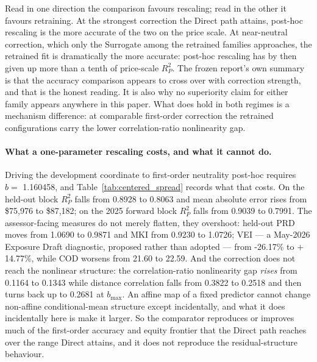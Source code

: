 \documentclass[10pt]{article}
\theoremstyle{definition}
\newcommand{\1}{\mathbf{1}}
\begin{document}
Read in one direction the comparison favours rescaling; read in the other it favours
retraining. At the strongest correction the Direct path attains, post-hoc rescaling is the more
accurate of the two on the price scale. At near-neutral correction, which only the Surrogate among
the retrained families approaches, the retrained fit is dramatically the more accurate: post-hoc
rescaling has by then given up more than a tenth of price-scale $R^2_P$. The frozen report's own
summary is that the accuracy comparison appears to cross over with correction strength, and that is
the honest reading. It is also why no superiority claim for either family appears anywhere in this
paper. What does hold in both regimes is a mechanism difference: at comparable first-order
correction the retrained configurations carry the lower correlation-ratio nonlinearity gap.

\paragraph{What a one-parameter rescaling costs, and what it cannot do.}
Driving the development coordinate to first-order neutrality post-hoc requires
$b=$ 1.160458, and Table~\ref{tab:centered_spread} records what that costs. On the held-out
block $R^2_P$ falls from 0.8928 to 0.8063 and mean absolute error rises from
\$75,976 to \$87,182; on the 2025 forward block $R^2_P$ falls from
0.9039 to 0.7991. The assessor-facing measures do not merely flatten, they
overshoot: held-out PRD moves from 1.0690 to 0.9871 and MKI from 0.9230 to
1.0726; VEI --- a May-2026 Exposure Draft diagnostic, proposed rather than adopted ---
from -26.17\% to $+$14.77\%, while COD worsens from 21.60 to
22.59. And the correction does not reach the nonlinear structure: the correlation-ratio
nonlinearity gap \emph{rises} from 0.1164 to 0.1343 while distance correlation
falls from 0.3822 to 0.2518 and then turns back up to 0.2681 at
$b_{\max}$. An affine map of a fixed predictor cannot change non-affine conditional-mean structure
except incidentally, and what it does incidentally here is make it larger. So the comparator
reproduces or improves much of the first-order accuracy and equity frontier that the Direct path
reaches over the range Direct attains, and it does not reproduce the residual-structure behaviour.
\end{document}

